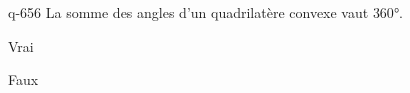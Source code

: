 \begin{truefalse}{q-656}
La somme des angles d'un quadrilatère convexe vaut $360$°.
\item* Vrai
\item Faux
\end{truefalse}


